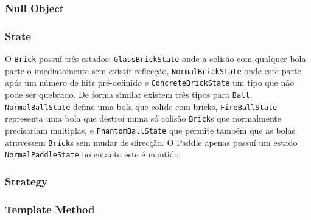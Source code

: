 \documentclass[a4paper]{article}
\begin{document}
\subsubsection{Null Object}

\subsubsection{State}
O \texttt{Brick} possuí três estados: \texttt{GlassBrickState} onde a colisão com qualquer bola parte-o imediatamente sem existir reflecção, \texttt{NormalBrickState} onde este parte após um número de hits pré-definido e \texttt{ConcreteBrickState} um tipo que não pode ser quebrado. De forma similar existem três tipos para \texttt{Ball}. \texttt{NormalBallState} define uma bola que colide com bricks, \texttt{FireBallState} representa uma bola que destroí numa só colisão \texttt{Brick}s que normalmente precisariam multiplas, e \texttt{PhantomBallState} que permite também que as bolas atravessem \texttt{Brick}s sem mudar de direcção. O Paddle apenas possuí um estado \texttt{NormalPaddleState} no entanto este é mantido 

\subsubsection{Strategy}

\subsubsection{Template Method}
\end{document}
